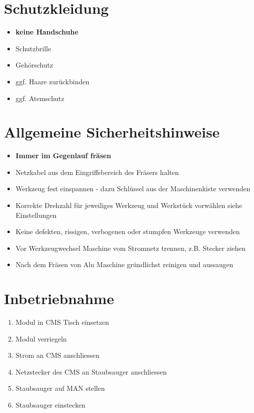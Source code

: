 \documentclass[10pt]{article}
\date{\vspace{-5ex}}
\title{\flushleft{FESTOOL Tischfr\"ase TF 1400}}
\begin{document}
\maketitle
\thispagestyle{fancy}
\section{Schutzkleidung}
\begin{itemize}
\item \textbf{keine Handschuhe}
\item Schutzbrille
\item Gehörschutz
\item ggf. Haare zurückbinden 
\item ggf. Atemschutz 
\end{itemize}
\section{Allgemeine Sicherheitshinweise}
\begin{itemize}
\item \textbf{Immer im Gegenlauf fräsen}
\item Netzkabel aus dem Eingriffsbereich des Fräsers halten
\item Werkzeug fest einspannen - dazu Schlüssel aus der Maschinenkiste verwenden
\item Korrekte Drehzahl für jeweiliges Werkzeug und Werkstück vorwählen siehe Einstellungen 
\item Keine defekten, rissigen, verbogenen oder stumpfen Werkzeuge verwenden
\item Vor Werkzeugwechsel Maschine vom Stromnetz trennen, z.B. Stecker ziehen
\item Nach dem Fräsen von Alu Maschine gründlichst reinigen und aussaugen
\end{itemize}

\section{Inbetriebnahme}
\begin{enumerate}
\item Modul in CMS Tisch einsetzen
\item Modul verriegeln
\item Strom an CMS anschliessen
\item Netzstecker des CMS an Staubsauger anschliessen
\item Staubsauger auf MAN stellen
\item Staubsauger einstecken
\end{enumerate}
\end{document}
